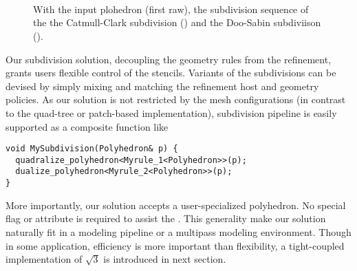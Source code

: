 \begin{figure}
  \centering
  \\
  \vspace{0.3cm}
  \\
  \vspace{0.3cm}
  \\
  \vspace{0.3cm}
  \caption{ With the input plohedron (first raw), 
  the subdivision sequence of the 
  the Catmull-Clark subdivision (\IL) and
  the Doo-Sabin subdiviison (\IR).}
  \label{fig:SubExample}
\end{figure}

Our subdivision solution, decoupling the geometry rules from the
refinement, grants users flexible control of the stencils.
Variants of the subdivisions can be devised by simply mixing
and matching the refinement host and geometry policies. As 
our solution is not restricted by the 
mesh configurations (in contrast to the quad-tree or patch-based 
implementation), subdivision pipeline is easily supported
as a composite function like
\begin{lstlisting}
void MySubdivision(Polyhedron& p) {
  quadralize_polyhedron<Myrule_1<Polyhedron>>(p);
  dualize_polyhedron<Myrule_2<Polyhedron>>(p);
} 
\end{lstlisting}

More importantly, our solution accepts a user-specialized 
polyhedron. No special flag or attribute is required 
to assist the \tr . This generality make our solution 
naturally fit in a modeling pipeline or a multipass modeling 
environment. Though in some application, efficiency is more
important than flexibility, a tight-coupled implementation
of $\sqrt{3}$ is introduced in next section.


 
